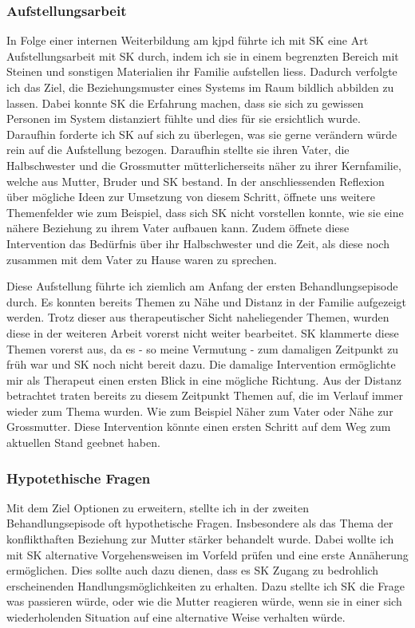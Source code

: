 \subsubsection{Aufstellungsarbeit}
In Folge einer internen Weiterbildung am \ac{kjpd} führte ich mit SK eine Art Aufstellungsarbeit mit SK durch, indem ich sie in einem begrenzten Bereich mit Steinen und sonstigen Materialien ihr Familie aufstellen liess. Dadurch verfolgte ich das Ziel, die Beziehungsmuster eines Systems im Raum bildlich abbilden zu lassen. Dabei konnte SK die Erfahrung machen, dass sie sich zu gewissen Personen im System distanziert fühlte und dies für sie ersichtlich wurde. Daraufhin forderte ich SK auf sich zu überlegen, was sie gerne verändern würde rein auf die Aufstellung bezogen. Daraufhin stellte sie ihren Vater, die Halbschwester und die Grossmutter mütterlicherseits näher zu ihrer Kernfamilie, welche aus Mutter, Bruder und SK bestand.  In der anschliessenden Reflexion über mögliche Ideen zur Umsetzung von diesem Schritt, öffnete uns weitere Themenfelder wie zum Beispiel, dass sich SK nicht vorstellen konnte, wie sie eine nähere Beziehung zu ihrem Vater aufbauen kann. Zudem öffnete diese Intervention das Bedürfnis über ihr Halbschwester und die Zeit, als diese noch zusammen mit dem Vater zu Hause waren zu sprechen.

Diese Aufstellung führte ich ziemlich am Anfang der ersten Behandlungsepisode durch. Es konnten bereits Themen zu Nähe und Distanz in der Familie aufgezeigt werden. Trotz dieser aus therapeutischer Sicht naheliegender Themen, wurden diese in der weiteren Arbeit vorerst nicht weiter bearbeitet. SK klammerte diese Themen vorerst aus, da es - so meine Vermutung - zum damaligen Zeitpunkt zu früh war und SK noch nicht bereit dazu. Die damalige Intervention ermöglichte mir als Therapeut einen ersten Blick in eine mögliche Richtung. Aus der Distanz betrachtet traten bereits zu diesem Zeitpunkt Themen auf, die im Verlauf immer wieder zum Thema wurden. Wie zum Beispiel Näher zum Vater oder Nähe zur Grossmutter. Diese Intervention könnte einen ersten Schritt auf dem Weg zum aktuellen Stand geebnet haben. 

\subsubsection{Hypotethische Fragen}
Mit dem Ziel Optionen zu erweitern, stellte ich in der zweiten Behandlungsepisode oft hypothetische Fragen. Insbesondere als das Thema der konflikthaften Beziehung zur Mutter stärker behandelt wurde. Dabei wollte ich mit SK alternative Vorgehensweisen im Vorfeld prüfen und eine erste Annäherung ermöglichen. Dies sollte auch dazu dienen, dass es SK Zugang zu bedrohlich erscheinenden Handlungsmöglichkeiten zu erhalten. Dazu stellte ich SK die Frage was passieren würde, oder wie die Mutter reagieren würde, wenn sie in einer sich wiederholenden Situation auf eine alternative Weise verhalten würde. 

